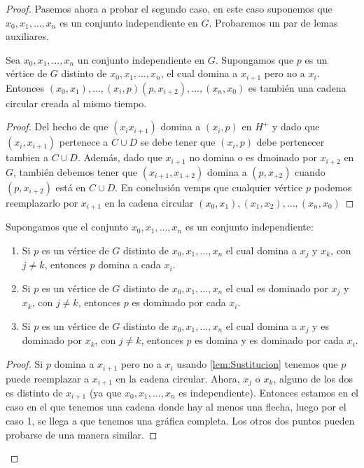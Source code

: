\begin{proof}
Pasemos ahora a probar el segundo caso, en este caso suponemos que $x_0,x_1,\dots,x_n$ es un conjunto independiente en $G$. Probaremos un par de lemas auxiliares. 

\begin{lema}
  \label{lem:Sustitucion}
  Sea $x_0,x_1,\dots,x_n $ un conjunto independiente en $G$. Supongamos que $p$ es un v\'ertice de $G$ distinto de $x_0,x_1,\dots,x_n$, el cual domina a $x_{i+1}$ pero no a $x_i$. Entonces $(x_0,x_1),\dots, (x_i,p)(p,x_{i+2}),\dots, (x_n,x_0)$ es tambi\'en una cadena circular creada al mismo tiempo.
\end{lema}
\begin{proof}
  Del hecho de que $(x_ix_{i+1})$ domina a $(x_i,p)$ en $H^+$ y dado que $(x_i,x_{i+1})$ pertenece a $C\cup D$ se debe tener que $(x_i,p)$ debe pertenecer tambien a $C\cup D$. Adem\'as, dado que $x_{i+1}$ no domina o es dmoinado por $x_{i+2}$ en $G$, tambi\'en debemos tener que $(x_{i+1},x_{1+2})$ domina a $(p,x_{+2})$ cuando $(p,x_{i+2})$ est\'a en $C\cup D$. En conclusi\'on vemps que cualquier v\'ertice $p$ podemos reemplazarlo por $x_{i+1}$ en la cadena circular $(x_0,x_1),(x_1,x_2),\dots , (x_n,x_0)$
\end{proof}


\begin{lema}
  \label{lem:Completa}
  Supongamos que el conjunto $x_0,x_1,\dots,x_n$ es un conjunto independiente:
  \begin{enumerate}
    \item Si $p$ es un v\'ertice de $G$ distinto de $x_0,x_1,\dots,x_n$ el cual domina a $x_j$ y $x_k$, con $j\neq k$, entonces $p$ domina a cada $x_i$.

    \item Si $p$ es un v\'ertice de $G$ distinto de $x_0,x_1,\dots,x_n$ el cual es dominado por $x_j$ y $x_k$, con $j\neq k$, entonces $p$ es dominado por cada $x_i$.

    \item Si $p$ es un v\'ertice de $G$ distinto de $x_0,x_1,\dots,x_n$ el cual domina a $x_j$ y es dominado por $x_k$, con $j\neq k$, entonces $p$ es domina y es dominado por cada $x_i$.
  \end{enumerate}

\end{lema}

\begin{proof} 
  Si $p $ domina a $x_{i+1}$ pero no a $x_i$ usando \cref{lem:Sustitucion} tenemos que $p$ puede reemplazar a $x_{i+1}$ en la cadena circular. Ahora, $x_j$ o $x_k$, alguno de los dos es distinto de $x_{i+1}$ (ya que $x_0,x_1,\dots,x_n$ es independiente). Entonces estamos en el caso en el que tenemos una cadena donde hay al menos una flecha, luego por el caso 1, se llega a que tenemos una gr\'afica completa.
  Los otros dos puntos pueden probarse de una manera similar.
\end{proof}  


\end{proof}
